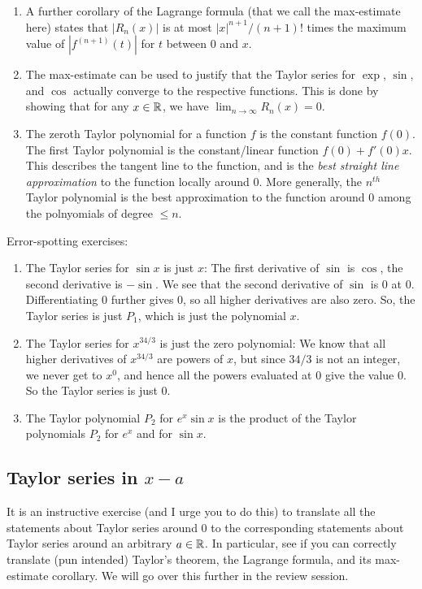 \documentclass[10pt]{amsart}
\begin{document}
\begin{enumerate}
\item A further corollary of the Lagrange formula (that we call the
  max-estimate here) states that $|R_n(x)|$ is at most $|x|^{n+1}/(n +
  1)!$ times the maximum value of $|f^{(n + 1)}(t)|$ for $t$ between
  $0$ and $x$.
\item The max-estimate can be used to justify that the Taylor series
  for $\exp$, $\sin$, and $\cos$ actually converge to the respective
  functions. This is done by showing that for any $x \in \mathbb{R}$, we have
  $\lim_{n \to \infty} R_n(x) = 0$.
\item The zeroth Taylor polynomial for a function $f$ is the constant
  function $f(0)$. The first Taylor polynomial is the constant/linear
  function $f(0) + f'(0)x$. This describes the tangent line to the
  function, and is the {\em best straight line approximation} to the
  function locally around $0$. More generally, the $n^{th}$ Taylor
  polynomial is the best approximation to the function around $0$
  among the polnyomials of degree $\le n$.
\end{enumerate}

Error-spotting exercises:

\begin{enumerate}
\item The Taylor series for $\sin x$ is just $x$: The first derivative
  of $\sin$ is $\cos$, the second derivative is $-\sin$. We see that
  the second derivative of $\sin$ is $0$ at $0$. Differentiating $0$
  further gives $0$, so all higher derivatives are also zero. So, the
  Taylor series is just $P_1$, which is just the polynomial $x$.
\item The Taylor series for $x^{34/3}$ is just the zero polynomial: We
  know that all higher derivatives of $x^{34/3}$ are powers of $x$,
  but since $34/3$ is not an integer, we never get to $x^0$, and hence
  all the powers evaluated at $0$ give the value $0$. So the Taylor
  series is just $0$.
\item The Taylor polynomial $P_2$ for $e^x\sin x$ is the product of
  the Taylor polynomials $P_2$ for $e^x$ and for $\sin x$.
\end{enumerate}

\subsection{Taylor series in $x - a$}

It is an instructive exercise (and I urge you to do this) to translate
all the statements about Taylor series around $0$ to the corresponding
statements about Taylor series around an arbitrary $a \in \mathbb{R}$. In
particular, see if you can correctly translate (pun intended) Taylor's
theorem, the Lagrange formula, and its max-estimate corollary. We will
go over this further in the review session.
\end{document}
